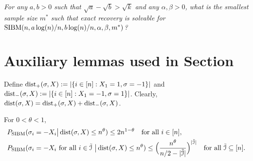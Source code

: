 \documentclass{article}
\begin{document}
\vspace*{.1in}
 \emph{For any $a,b> 0$ such that $\sqrt{a}-\sqrt{b}> \sqrt{k}$ and any $\alpha,\beta>0$, what is the smallest sample size $m^\ast$ such that exact recovery is solvable for $\operatorname{SIBM}(n,a\log(n)/n, b\log(n)/n,\alpha,\beta,m^\ast)$?}

\appendix
\section{Auxiliary lemmas used in Section}
Define $\operatorname{dist}_+(\sigma,X):=|\{i\in[n]:X_1=1, \sigma=-1\}|$ and $\operatorname{dist}_-(\sigma,X):=|\{i\in[n]:X_1=-1, \sigma=1\}|$. Clearly, $\operatorname{dist}(\sigma,X)=\operatorname{dist}_+(\sigma,X)+\operatorname{dist}_-(\sigma,X)$.

\begin{lemma} \label{lm:bq}
For $0<\theta<1$,
\begin{align}
& P_{\operatorname{SIBM}}(\sigma_i=-X_i
\big| \operatorname{dist}(\sigma,X) \le n^\theta) \le 2 n^{1-\theta}
\quad \text{for all~} i\in[n] , \label{eq:l1}\\
& P_{\operatorname{SIBM}}(\sigma_i=-X_i \text{~for all~}  i\in\tilde{\mathcal{I}}
~\big| \operatorname{dist}(\sigma,X) \le n^\theta) \le \Big(\frac{n^\theta}{n/2-|\tilde{\mathcal{I}}|}
\Big)^{|\tilde{\mathcal{I}}|}
\quad \text{for all~} \tilde{\mathcal{I}}\subseteq [n] .   \label{eq:l2}
\end{align}
\end{lemma}
\end{document}
